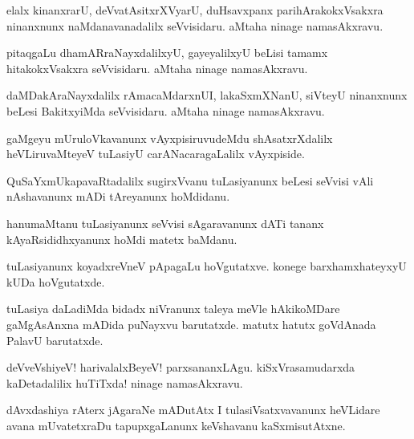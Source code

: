 \documentclass{article}
\begin{document}
\begin{mng}%
elalx kinanxrarU, deVvatAsitxrXVyarU, duHsavxpanx parihArakokxVsakxra ninanxnunx naMdanavanadalilx seVvisidaru. aMtaha ninage namasAkxravu.
\end{mng}

\begin{mng}%
pitaqgaLu dhamARraNayxdalilxyU, gayeyalilxyU beLisi tamamx hitakokxVsakxra seVvisidaru. aMtaha ninage namasAkxravu.
\end{mng}

\begin{mng}%
daMDakAraNayxdalilx rAmacaMdarxnUI, lakaSxmXNanU, siVteyU ninanxnunx beLesi BakitxyiMda seVvisidaru. aMtaha ninage namasAkxravu.
\end{mng}

\begin{mng}%
gaMgeyu mUruloVkavanunx vAyxpisiruvudeMdu shAsatxrXdalilx heVLiruvaMteyeV tuLasiyU carANacaragaLalilx vAyxpiside.
\end{mng}

\begin{mng}%
QuSaYxmUkapavaRtadalilx sugirxVvanu tuLasiyanunx beLesi seVvisi vAli nAshavanunx mADi tAreyanunx hoMdidanu.
\end{mng}

\begin{mng}%
hanumaMtanu tuLasiyanunx seVvisi sAgaravanunx dATi tananx kAyaRsididhxyanunx hoMdi matetx baMdanu.
\end{mng}

\begin{mng}%
tuLasiyanunx koyadxreVneV pApagaLu hoVgutatxve. konege barxhamxhateyxyU kUDa hoVgutatxde.
\end{mng}

\begin{mng}%
tuLasiya daLadiMda bidadx niVranunx taleya meVle hAkikoMDare gaMgAsAnxna mADida puNayxvu barutatxde. matutx hatutx goVdAnada PalavU barutatxde.
\end{mng}

\begin{mng}%
deVveVshiyeV! harivalalxBeyeV! parxsananxLAgu. kiSxVrasamudarxda kaDetadalilix huTiTxda! ninage namasAkxravu.
\end{mng}

\begin{mng}%
dAvxdashiya rAterx jAgaraNe mADutAtx I tulasiVsatxvavanunx heVLidare avana mUvatetxraDu tapupxgaLanunx keVshavanu kaSxmisutAtxne.
\end{mng}
\end{document}
